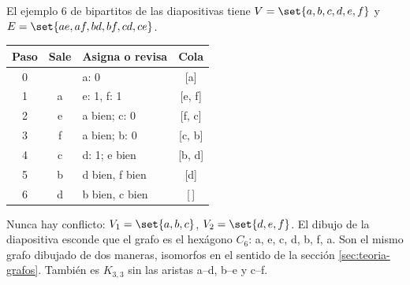 \documentclass[11pt,letterpaper]{article}
\begin{document}
\begin{ejemplo}
  \label{ej:bipartito-traza-c6}
  El ejemplo 6 de bipartitos de las diapositivas tiene
  $V = \set{a, b, c, d, e, f}$ y
  $E = \set{ae, af, bd, bf, cd, ce}$.

  \begin{minipage}[c]{0.47\linewidth}
  \centering
  \small
  \begin{tabular}{cclc}
    \toprule
    \textbf{Paso} & \textbf{Sale} & \textbf{Asigna o revisa}
      & \textbf{Cola} \\
    \midrule
    0 & & a: 0 & [a] \\
    1 & a & e: 1, f: 1 & [e, f] \\
    2 & e & a bien; c: 0 & [f, c] \\
    3 & f & a bien; b: 0 & [c, b] \\
    4 & c & d: 1; e bien & [b, d] \\
    5 & b & d bien, f bien & [d] \\
    6 & d & b bien, c bien & [\,] \\
    \bottomrule
  \end{tabular}
  \end{minipage}\hfill
  \begin{minipage}[c]{0.5\linewidth}
  \centering
  \end{minipage}

  Nunca hay conflicto: $V_1 = \set{a, b, c}$, $V_2 = \set{d, e, f}$.
  El dibujo de la diapositiva esconde que el grafo es el hexágono
  $C_6$: a, e, c, d, b, f, a. Son el mismo grafo dibujado de dos
  maneras, isomorfos en el sentido de la sección
  \ref{sec:teoria-grafos}. También es $K_{3,3}$ sin las aristas a--d,
  b--e y c--f.
\end{ejemplo}
\end{document}
